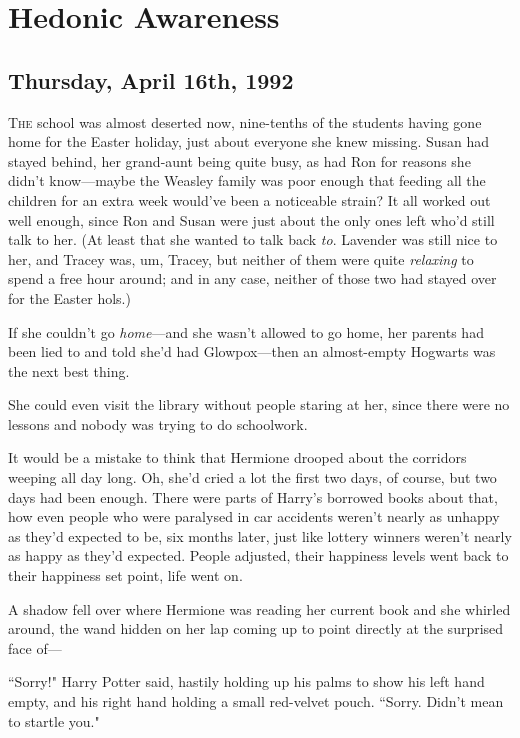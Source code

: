 \chapter{Hedonic Awareness}

\section{Thursday, April 16th, 1992}

\lettrine{T}{he} school was almost deserted now, nine-tenths of the students having gone home for the Easter holiday, just about everyone she knew missing. Susan had stayed behind, her grand-aunt being quite busy, as had Ron for reasons she didn't know—maybe the Weasley family was poor enough that feeding all the children for an extra week would've been a noticeable strain? It all worked out well enough, since Ron and Susan were just about the only ones left who'd still talk to her. (At least that she wanted to talk back \emph{to}. Lavender was still nice to her, and Tracey was, um, Tracey, but neither of them were quite \emph{relaxing} to spend a free hour around; and in any case, neither of those two had stayed over for the Easter hols.)

If she couldn't go \emph{home}—and she wasn't allowed to go home, her parents had been lied to and told she'd had Glowpox—then an almost-empty Hogwarts was the next best thing.

She could even visit the library without people staring at her, since there were no lessons and nobody was trying to do schoolwork.

It would be a mistake to think that Hermione drooped about the corridors weeping all day long. Oh, she'd cried a lot the first two days, of course, but two days had been enough. There were parts of Harry's borrowed books about that, how even people who were paralysed in car accidents weren't nearly as unhappy as they'd expected to be, six months later, just like lottery winners weren't nearly as happy as they'd expected. People adjusted, their happiness levels went back to their happiness set point, life went on.

A shadow fell over where Hermione was reading her current book and she whirled around, the wand hidden on her lap coming up to point directly at the surprised face of—

``Sorry!" Harry Potter said, hastily holding up his palms to show his left hand empty, and his right hand holding a small red-velvet pouch. ``Sorry. Didn't mean to startle you."

